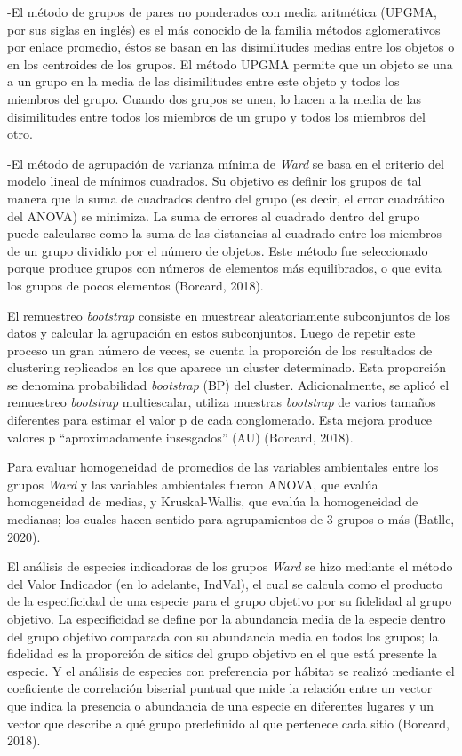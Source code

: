 \documentclass[11pt,]{article}
\begin{document}
-El método de grupos de pares no ponderados con media aritmética (UPGMA,
por sus siglas en inglés) es el más conocido de la familia métodos
aglomerativos por enlace promedio, éstos se basan en las disimilitudes
medias entre los objetos o en los centroides de los grupos. El método
UPGMA permite que un objeto se una a un grupo en la media de las
disimilitudes entre este objeto y todos los miembros del grupo. Cuando
dos grupos se unen, lo hacen a la media de las disimilitudes entre todos
los miembros de un grupo y todos los miembros del otro.

-El método de agrupación de varianza mínima de \emph{Ward} se basa en el
criterio del modelo lineal de mínimos cuadrados. Su objetivo es definir
los grupos de tal manera que la suma de cuadrados dentro del grupo (es
decir, el error cuadrático del ANOVA) se minimiza. La suma de errores al
cuadrado dentro del grupo puede calcularse como la suma de las
distancias al cuadrado entre los miembros de un grupo dividido por el
número de objetos. Este método fue seleccionado porque produce grupos
con números de elementos más equilibrados, o que evita los grupos de
pocos elementos (Borcard, 2018).

El remuestreo \emph{bootstrap} consiste en muestrear aleatoriamente
subconjuntos de los datos y calcular la agrupación en estos
subconjuntos. Luego de repetir este proceso un gran número de veces, se
cuenta la proporción de los resultados de clustering replicados en los
que aparece un cluster determinado. Esta proporción se denomina
probabilidad \emph{bootstrap} (BP) del cluster. Adicionalmente, se
aplicó el remuestreo \emph{bootstrap} multiescalar, utiliza muestras
\emph{bootstrap} de varios tamaños diferentes para estimar el valor p de
cada conglomerado. Esta mejora produce valores p ``aproximadamente
insesgados'' (AU) (Borcard, 2018).

Para evaluar homogeneidad de promedios de las variables ambientales
entre los grupos \emph{Ward} y las variables ambientales fueron ANOVA,
que evalúa homogeneidad de medias, y Kruskal-Wallis, que evalúa la
homogeneidad de medianas; los cuales hacen sentido para agrupamientos de
3 grupos o más (Batlle, 2020).

El análisis de especies indicadoras de los grupos \emph{Ward} se hizo
mediante el método del Valor Indicador (en lo adelante, IndVal), el cual
se calcula como el producto de la especificidad de una especie para el
grupo objetivo por su fidelidad al grupo objetivo. La especificidad se
define por la abundancia media de la especie dentro del grupo objetivo
comparada con su abundancia media en todos los grupos; la fidelidad es
la proporción de sitios del grupo objetivo en el que está presente la
especie. Y el análisis de especies con preferencia por hábitat se
realizó mediante el coeficiente de correlación biserial puntual que mide
la relación entre un vector que indica la presencia o abundancia de una
especie en diferentes lugares y un vector que describe a qué grupo
predefinido al que pertenece cada sitio (Borcard, 2018).
\end{document}
